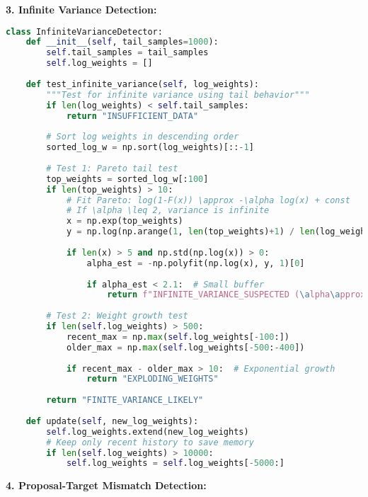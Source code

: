 \documentclass[11pt]{article}
\begin{document}
\textbf{3. Infinite Variance Detection:}

\begin{lstlisting}[language=Python, basicstyle=\small]
class InfiniteVarianceDetector:
    def __init__(self, tail_samples=1000):
        self.tail_samples = tail_samples
        self.log_weights = []
        
    def test_infinite_variance(self, log_weights):
        """Test for infinite variance using tail behavior"""
        if len(log_weights) < self.tail_samples:
            return "INSUFFICIENT_DATA"
        
        # Sort log weights in descending order
        sorted_log_w = np.sort(log_weights)[::-1]
        
        # Test 1: Pareto tail test
        top_weights = sorted_log_w[:100]
        if len(top_weights) > 10:
            # Fit Pareto: log(1-F(x)) \approx -\alpha log(x) + const
            # If \alpha \leq 2, variance is infinite
            x = np.exp(top_weights)
            y = np.log(np.arange(1, len(top_weights)+1) / len(log_weights))
            
            if len(x) > 5 and np.std(np.log(x)) > 0:
                alpha_est = -np.polyfit(np.log(x), y, 1)[0]
                
                if alpha_est < 2.1:  # Small buffer
                    return f"INFINITE_VARIANCE_SUSPECTED (\alpha\approx{alpha_est:.2f})"
        
        # Test 2: Weight growth test
        if len(self.log_weights) > 500:
            recent_max = np.max(self.log_weights[-100:])
            older_max = np.max(self.log_weights[-500:-400])
            
            if recent_max - older_max > 10:  # Exponential growth
                return "EXPLODING_WEIGHTS"
        
        return "FINITE_VARIANCE_LIKELY"
    
    def update(self, new_log_weights):
        self.log_weights.extend(new_log_weights)
        # Keep only recent history to save memory
        if len(self.log_weights) > 10000:
            self.log_weights = self.log_weights[-5000:]
\end{lstlisting}

\textbf{4. Proposal-Target Mismatch Detection:}
\end{document}
